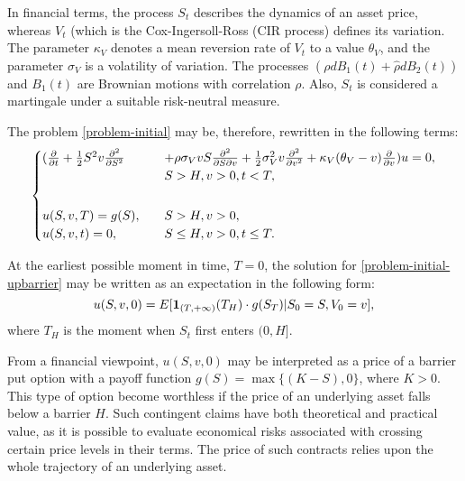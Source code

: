 \documentclass[a4paper]{jpconf}
\begin{document}
{In financial terms, the process $S_t$ describes the dynamics of an asset price, whereas $V_t$ (which is the Cox-Ingersoll-Ross (CIR \cite{cir} process) defines its variation. The parameter $\kappa_V$ denotes a mean reversion rate of $V_t$ to a value $\theta_V$, and the parameter $\sigma_V$ is a volatility of variation.
The processes $(\rho dB_1(t) + \hat{\rho} dB_2(t))$ and $B_1(t)$ are Brownian motions with correlation $\rho$. Also,
$S_t$ is considered a martingale under a suitable risk-neutral measure.

The problem \eqref{problem-initial} may be, therefore, rewritten in the following terms:
\begin{equation}\label{problem-initial-upbarrier}
\begin{array}{l}
\begin{cases}
(\frac{\partial}{\partial t} + \frac{1}{2}S^2 v \frac{\partial ^ 2}{\partial S ^ 2}& + 
\rho \sigma_V v S \frac{\partial ^ 2}{\partial S \partial v} + 
\frac{1}{2}\sigma^2_V v\frac{\partial ^ 2}{\partial v ^ 2} + 
\kappa_V(\theta_V - v) \frac{\partial}{\partial v}) u = 0, \\ &S > H, v > 0,  t < T, \\
\smallskip \\
u(S,v,T) = g(S), \quad &S > H, v > 0, \\
u(S,v,t) = 0, \quad &S \le H, v > 0, t \le T.\\
\end{cases}
\end{array}
\end{equation}

At the earliest possible moment in time, $T=0$, the solution for \eqref{problem-initial-upbarrier} may be written as an expectation in the following form:
\begin{equation}\label{solu}
u(S,v,0) = E[{\bf 1}_{(T,+\infty)}(T_H) \cdot g(S_T) | S_0 = S, V_0 = v],
\end{equation}
where $T_H$ is the moment when $S_t$ first enters $(0, H]$. 

From a financial viewpoint, $u(S,v,0)$ may be interpreted as a price of a barrier put option with a payoff function $g(S) = \max\{(K-S), 0\}$, where $K>0$. This type of option become worthless if the price of an underlying asset falls below a barrier $H$. Such contingent claims have both theoretical and practical value, as it is possible to evaluate economical risks associated with crossing certain price levels in their terms. The price of such contracts relies upon the whole trajectory of an underlying asset.

}
\end{document}
